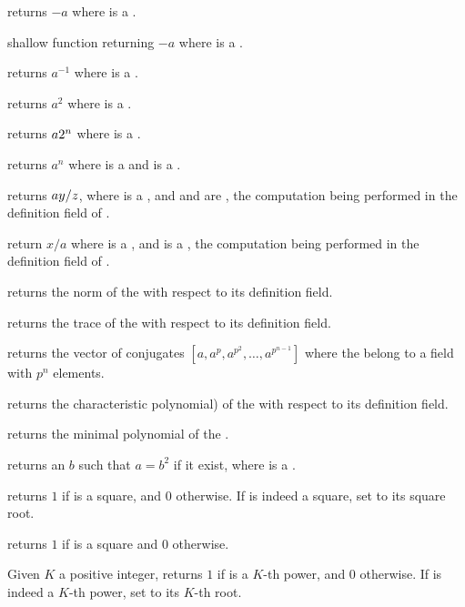  returns $-a$ where  is a .

 shallow function returning $-a$ where  is a
.

 returns $a^{-1}$ where  is a .

 returns $a^2$ where  is a .

 returns $a\*2^n$ where  is a .

 returns $a^n$ where  is a 
and is a .

 returns $a\*y/z$, where 
is a , and  and  are , the computation being
performed in the definition field of .

 return $x/a$ where  is a
, and  is a , the computation being
performed in the definition field of .

 returns the norm of the   with
respect to its definition field.

 returns the trace of the   with
respect to its definition field.

 returns the vector of conjugates
$[a,a^p,a^{p^2},\ldots,a^{p^{n-1}}]$ where the   belong to a
field with $p^n$ elements.

 returns the characteristic polynomial) of the
  with respect to its definition field.

 returns the minimal polynomial of
the  .

 returns an  $b$ such that $a=b^2$ if
it exist, where  is a .

 returns $1$ if  is a
square, and $0$ otherwise. If  is indeed a square, set  to its
square root.

 returns $1$ if  is a square and $0$
otherwise.

 Given $K$ a positive integer,
returns $1$ if  is a $K$-th power, and $0$ otherwise. If  is
indeed a $K$-th power, set  to its $K$-th root.

